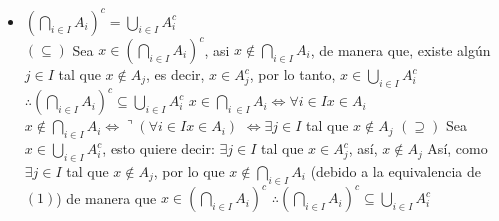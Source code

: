 \begin{itemize}
	\item $(\bigcap_{i \in I}A_i)^c = \bigcup_{i \in I}A^c_i$\newline\\
	$(\subseteq)$ Sea $x \in (\bigcap_{i \in I}A_i)^c$, asi $x \notin \bigcap_{i \in I}A_i$, \newline
	de manera que, existe algún $j \in I$ tal que $x \notin A_j$, \newline
	es decir, $x \in A_j^c$, por lo tanto, $x \in \bigcup_{i \in I}A_i^c$\newline
	$\therefore (\bigcap_{i \in I}A_i)^c \subseteq \bigcup_{i \in I}A_i^c$\newline
	$x \in \bigcap_{i \ \in I}A_i \iff \forall i \in I x \in A_i$\newline
	$x \notin \bigcap_{i \in I}A_i \iff \urcorner(\forall i \in I x \in A_i)$\newline
	$\iff \exists j \in I$ tal que $x \notin A_j$\newline
	$(\supseteq)$ Sea $x \in \bigcup_{i \in I}A_i^c$, esto quiere decir:\newline
	$\exists j \in I$ tal que $x \in A_j^c$, así, $x \notin A_j$\newline
	Así, como $\exists j \in I$ tal que $x \notin A_j$, por lo que\newline
	$x \notin \bigcap_{i \in I}A_i$ (debido a la equivalencia de $(1)$)\newline
	de manera que $x \in (\bigcap_{i \in I}A_i)^c$\newline
	$\therefore (\bigcap_{i \in I}A_i)^c \subseteq \bigcup_{i \in I}A_i^c$
	
	
\end{itemize}